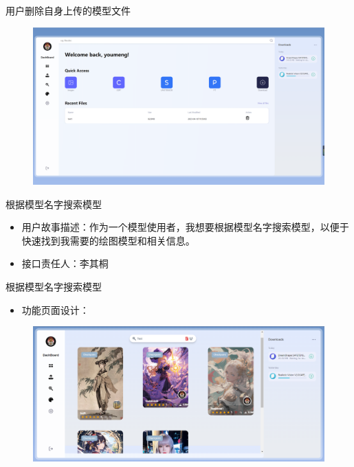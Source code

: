 \begin{frame}{用户删除自身上传的模型文件}
    \begin{figure}[H]
        \centering
        \includegraphics[width=\textwidth]{contents/figure/remove_result.jpg}
    \end{figure}
\end{frame}

\begin{frame}{根据模型名字搜索模型}
    \begin{itemize}
        \item 用户故事描述：作为一个模型使用者，我想要根据模型名字搜索模型，以便于快速找到我需要的绘图模型和相关信息。
        \item 接口责任人：李其桐
    \end{itemize}
\end{frame}

\begin{frame}{根据模型名字搜索模型}
    \begin{itemize}
        \item 功能页面设计：
    \end{itemize}
    \begin{figure}[H]
        \centering
        \includegraphics[width=\textwidth]{contents/figure/search_model.png}
    \end{figure}
\end{frame}


